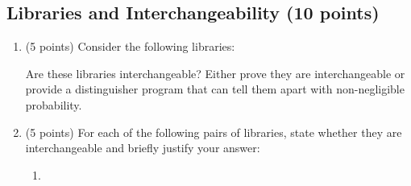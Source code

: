 \documentclass[10pt,a4paper,american]{exam}
\begin{document}
\subsection{Libraries and Interchangeability (10 points)}

\begin{enumerate}
	\item (5 points) Consider the following libraries:
	      \begin{center}
	      \end{center}
	      Are these libraries interchangeable? Either prove they are interchangeable or provide a distinguisher program that can tell them apart with non-negligible probability.

	\item (5 points) For each of the following pairs of libraries, state whether they are interchangeable and briefly justify your answer:
	      \begin{enumerate}
		      \item
		            \begin{center}
		            \end{center}


\end{enumerate}
\end{enumerate}
\end{document}
